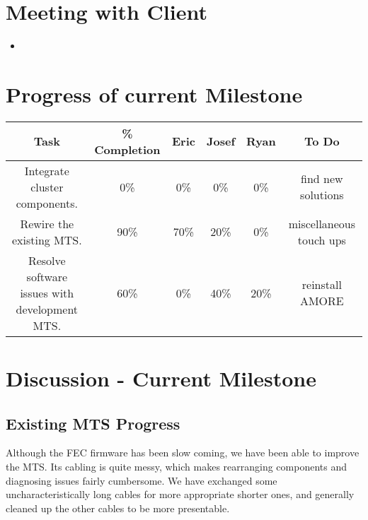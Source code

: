 \documentclass[12pt]{article}
\newcommand\tab[1][1cm]{\hspace*{#1}}
\begin{document}
\section{Meeting with Client}

\begin{itemize}
\item 
\end{itemize}

\section{Progress of current Milestone}

\begin{adjustwidth}{-3.5cm}{}
  \begin{center}
    \begin{tabular}{|c|c|c|c|c|c|}
      \hline
      Task & \% Completion & Eric & Josef & Ryan & To Do \\
      \hline
      Integrate cluster components. & 0\% & 0\% & 0\% & 0\% & find new solutions \\
      Rewire the existing MTS. & 90\% & 70\% & 20\% & 0\% & miscellaneous touch ups \\
      Resolve software issues with development MTS. & 60\% & 0\% & 40\% & 20\% &
                                                                                 reinstall
                                                                                 AMORE
      \\
      \hline   
    \end{tabular}
  \end{center}
\end{adjustwidth}

\section{Discussion - Current Milestone}

\subsection{Existing MTS Progress}

\tab Although the FEC firmware has been slow coming, we have been able to improve the
MTS. Its cabling is quite messy, which makes rearranging components and
diagnosing issues fairly cumbersome. We have exchanged some uncharacteristically
long cables for more appropriate shorter ones, and generally cleaned up the
other cables to be more presentable.
\end{document}
